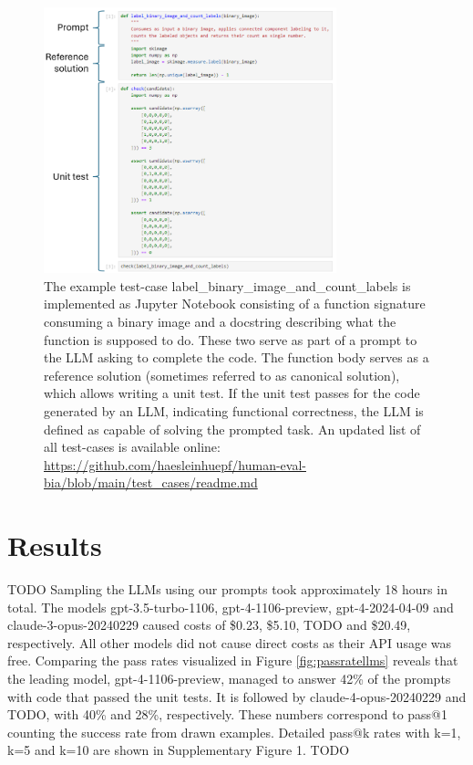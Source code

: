 \documentclass{ecai}
\begin{document}
\begin{figure}[h]
\centering
\includegraphics[width=8.5cm]{example_test_case.png}
\caption{The example test-case label\_binary\_image\_and\_count\_labels is implemented as Jupyter Notebook consisting of a function signature consuming a binary image and a docstring describing what the function is supposed to do. These two serve as part of a prompt to the LLM asking to complete the code. The function body serves as a reference solution (sometimes referred to as canonical solution), which allows writing a unit test. If the unit test passes for the code generated by an LLM, indicating functional correctness, the LLM is defined as capable of solving the prompted task. An updated list of all test-cases is available online: 
\url{https://github.com/haesleinhuepf/human-eval-bia/blob/main/test_cases/readme.md}
\newline
\newline
}
\label{fig:exampletestcase}
\end{figure}



\section{Results}

TODO
Sampling the LLMs using our prompts took approximately 18 hours in total. The models gpt-3.5-turbo-1106, gpt-4-1106-preview, gpt-4-2024-04-09 and claude-3-opus-20240229 caused costs of \$0.23, \$5.10, TODO and \$20.49, respectively. All other models did not cause direct costs as their API usage was free. Comparing the pass rates visualized in Figure \ref{fig:passratellms} reveals that the leading model, gpt-4-1106-preview, managed to answer 42\% of the prompts with code that passed the unit tests. It is followed by claude-4-opus-20240229 and TODO, with 40\% and 28\%, respectively. These numbers correspond to pass@1 counting the success rate from drawn examples. Detailed pass@k rates with k=1, k=5 and k=10 are shown in Supplementary Figure 1. TODO
\end{document}
